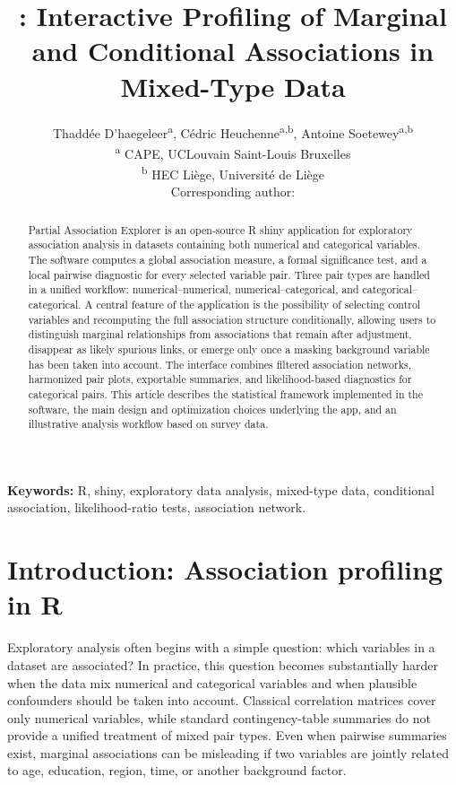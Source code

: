 \documentclass[11pt]{article}
\author{
  Thadd\'ee D'haegeleer\textsuperscript{a},
  C\'edric Heuchenne\textsuperscript{a,b},
  Antoine Soetewey\textsuperscript{a,b}\\[0.6em]
  \normalsize\textsuperscript{a} CAPE, UCLouvain Saint-Louis Bruxelles\\
  \normalsize\textsuperscript{b} HEC Li\`ege, Universit\'e de Li\`ege\\[0.4em]
  \normalsize Corresponding author: \email{thaddee.dhaegeleer@uclouvain.be}
}
\title{\appname: Interactive Profiling of Marginal and Conditional Associations in Mixed-Type Data}
\date{}
\newcommand{\appname}{Partial Association Explorer}
\newcommand{\pkg}[1]{\textsf{#1}}
\newcommand{\proglang}[1]{\textsf{#1}}
\begin{document}
\maketitle

\begin{abstract}
  \appname{} is an open-source \proglang{R} \citep{R} \pkg{shiny}
  \citep{Shiny} application for exploratory association analysis in datasets
  containing both numerical and categorical variables. The software computes a
  global association measure, a formal significance test, and a local pairwise
  diagnostic for every selected variable pair. Three pair types are handled in
  a unified workflow: numerical--numerical, numerical--categorical, and
  categorical--categorical. A central feature of the application is the
  possibility of selecting control variables and recomputing the full
  association structure conditionally, allowing users to distinguish marginal
  relationships from associations that remain after adjustment, disappear as
  likely spurious links, or emerge only once a masking background variable has
  been taken into account. The interface combines filtered association
  networks, harmonized pair plots, exportable summaries, and likelihood-based
  diagnostics for categorical pairs. This article describes the statistical
  framework implemented in the software, the main design and optimization
  choices underlying the app, and an illustrative analysis workflow
  based on survey data.
\end{abstract}

\noindent\textbf{Keywords:} \proglang{R}, \pkg{shiny}, exploratory data analysis, mixed-type data, conditional association, likelihood-ratio tests, association network.

\bigskip

\section[Introduction: Association profiling in R]{Introduction: Association profiling in \proglang{R}}
\label{sec:intro}

Exploratory analysis often begins with a simple question: which variables in a
dataset are associated? In practice, this question becomes substantially harder
when the data mix numerical and categorical variables and when plausible
confounders should be taken into account. Classical correlation matrices cover
only numerical variables, while standard contingency-table summaries do not
provide a unified treatment of mixed pair types. Even when pairwise summaries
exist, marginal associations can be misleading if two variables are jointly
related to age, education, region, time, or another background factor.
\end{document}
